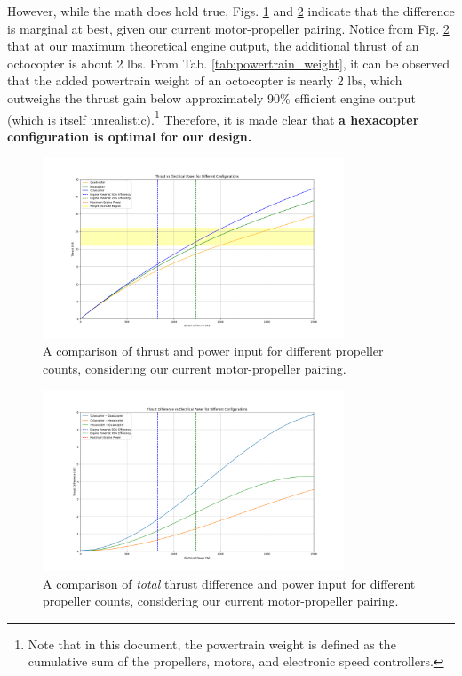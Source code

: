 \documentclass{article}
\begin{document}
However, while the math does hold true, Figs. \ref{fig:uav_comparison} and \ref{fig:uav_difference_comparison} indicate that the difference is marginal at best, given our current motor-propeller pairing. Notice from Fig. \ref{fig:uav_difference_comparison} that at our maximum theoretical engine output, the additional thrust of an octocopter is about 2 lbs. From Tab. \ref{tab:powertrain_weight}, it can be observed that the added powertrain weight of an octocopter is nearly 2 lbs, which outweighs the thrust gain below approximately 90\% efficient engine output (which is itself unrealistic).\footnote{Note that in this document, the powertrain weight is defined as the cumulative sum of the propellers, motors, and electronic speed controllers.} Therefore, it is made clear that \textbf{a hexacopter configuration is optimal for our design.}

\begin{figure}[htbp]
    \centering
    \includegraphics[width=0.8\textwidth]{UAV Comparison (experimental).png}
    \caption{A comparison of thrust and power input for different propeller counts, considering our current motor-propeller pairing.}
    \label{fig:uav_comparison}
\end{figure}
\begin{figure}[htbp]
    \centering
    \includegraphics[width=0.8\textwidth]{UAV Difference Comparison (experimental).png}
    \caption{A comparison of \textit{total} thrust difference and power input for different propeller counts, considering our current motor-propeller pairing.}
    \label{fig:uav_difference_comparison}
\end{figure}
\end{document}
